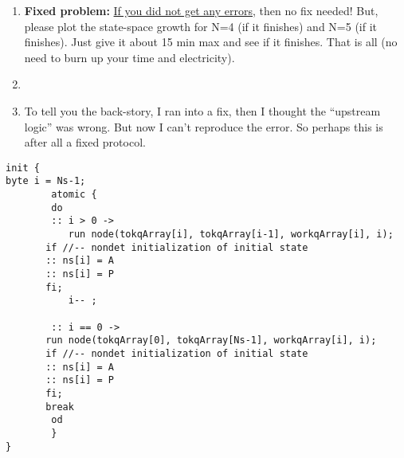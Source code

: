 \documentclass[11pt]{article}
\begin{document}
\begin{enumerate}
\begin{enumerate}
\begin{enumerate}
    \item {\bf Fixed problem:\/} \underline{If you did not get any errors}, then no fix needed!
      But, please plot the state-space growth for N=4 (if it finishes) and N=5 (if it finishes). Just give
      it about 15 min max and see if it finishes. That is all (no need to burn up your time and electricity).
      
    \item[]
            \item[]
      To tell you
      the back-story, I ran into a fix, then I thought the ``upstream logic'' was wrong.
      But now I can't reproduce the error. So perhaps this is after all a fixed protocol.

    \end{enumerate}
  \end{enumerate}

  \begin{scriptsize}  
\begin{verbatim}
init {
byte i = Ns-1;
        atomic {
        do
        :: i > 0 ->     
           run node(tokqArray[i], tokqArray[i-1], workqArray[i], i);
	   if //-- nondet initialization of initial state
	   :: ns[i] = A 
	   :: ns[i] = P
	   fi;
           i-- ;	   
	   
        :: i == 0 ->
	   run node(tokqArray[0], tokqArray[Ns-1], workqArray[i], i);
	   if //-- nondet initialization of initial state
	   :: ns[i] = A
	   :: ns[i] = P
	   fi;	   
	   break
        od
        }
} \end{verbatim}
  \end{scriptsize}
  

\begin{minipage}{\minpagw}
\end{minipage}
\end{enumerate}
\end{document}
